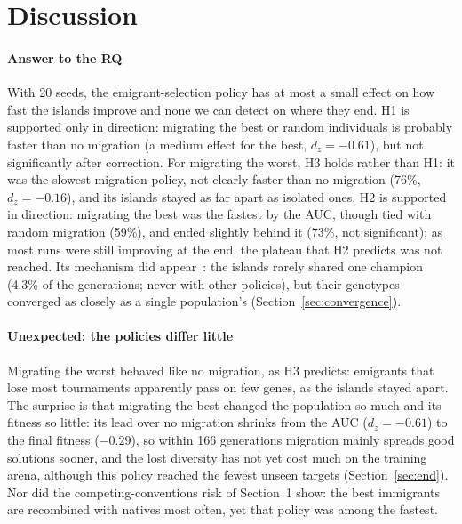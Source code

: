 \documentclass[sigconf]{acmart}
\begin{document}
\section{Discussion}

\paragraph{Answer to the RQ} With 20 seeds, the emigrant-selection policy has
at most a small effect on how fast the islands improve and none we can detect
on where they end. H1 is supported only in direction: migrating the best or
random individuals is probably faster than no migration (a medium effect for
the best, $d_z = -0.61$), but not significantly after correction. For
migrating the worst, H3 holds rather than H1: it was the slowest migration
policy, not clearly faster than no migration (76\%, $d_z = -0.16$), and its
islands stayed as far apart as isolated ones. H2 is supported in direction:
migrating the best was the fastest by the AUC, though tied with random
migration (59\%), and ended slightly behind it (73\%, not significant); as most runs were
still improving at the end, the plateau that H2 predicts was not reached. Its
mechanism did appear~\cite{cantupaz2001migration}: the islands rarely shared
one champion (4.3\% of the generations; never with other policies), but their genotypes converged as
closely as a single population's (Section~\ref{sec:convergence}).

\paragraph{Unexpected: the policies differ little} Migrating the worst
behaved like no migration, as H3 predicts: emigrants that lose most
tournaments apparently pass on few genes, as the islands stayed apart. The
surprise is that migrating the best changed the population so much and its
fitness so little: its lead over no migration shrinks from the AUC ($d_z =
-0.61$) to the final fitness ($-0.29$), so within 166 generations migration
mainly spreads good solutions sooner, and the lost diversity has not yet cost
much on the training arena, although this policy reached the fewest unseen
targets (Section~\ref{sec:end}). Nor did the competing-conventions risk of
Section~1 show: the best immigrants are recombined with natives most often,
yet that policy was among the fastest.
\end{document}
